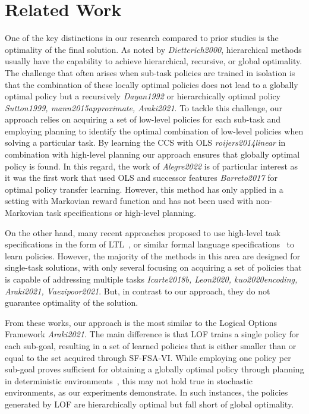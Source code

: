 \section{Related Work}
One of the key distinctions in our research compared to prior studies is the optimality of the final solution. As noted by \textit{Dietterich2000}, hierarchical methods usually have the capability to achieve hierarchical, recursive, or global optimality. The challenge that often arises when sub-task policies are trained in isolation is that the combination of these locally optimal policies does not lead to a globally optimal policy but a recursively \textit{Dayan1992} or hierarchically optimal policy \textit{Sutton1999, mann2015approximate, Araki2021}.  To tackle this challenge, our approach relies on acquiring a set of low-level policies for each sub-task and employing planning to identify the optimal combination of low-level policies when solving a particular task. By learning the CCS with OLS \textit{roijers2014linear} in combination with high-level planning our approach ensures that globally optimal policy is found. In this regard, the work of \textit{Alegre2022} is of particular interest as it was the first work that used OLS and successor features \textit{Barreto2017} for optimal policy transfer learning. However, this method has only applied in a setting with Markovian reward function and has not been used with non-Markovian task specifications or high-level planning. 

On the other hand, many recent approaches proposed to use high-level task specifications in the form of LTL~\citep{Icarte2018b, kuo2020encoding, Vaezipoor2021, Jothimurugan2021}, or similar formal language specifications~\citep{ToroIcarte2019,Camacho2019, Araki2021, Icarte2022} to learn policies. However, the majority of the methods in this area are designed for single-task solutions, with only several focusing on acquiring a set of policies that is capable of addressing multiple tasks \textit{Icarte2018b, Leon2020, kuo2020encoding, Araki2021, Vaezipoor2021}. But, in contrast to our approach, they do not guarantee optimality of the solution.

From these works, our approach is the most similar to the Logical Options Framework \textit{Araki2021}. The main difference is that LOF trains a single policy for each sub-goal, resulting in a set of learned policies that is either smaller than or equal to the set acquired through SF-FSA-VI. While employing one policy per sub-goal proves sufficient for obtaining a globally optimal policy through planning in deterministic environments~\citep{Wen2020}, this may not hold true in stochastic environments, as our experiments demonstrate. In such instances, the policies generated by LOF are hierarchically optimal but fall short of global optimality.



